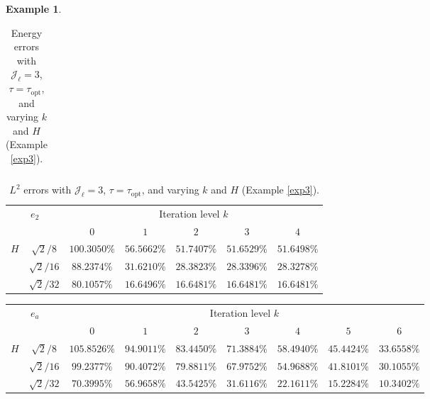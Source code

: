\documentclass{article}[11pt]
\theoremstyle{definition}
\newtheorem{exmp}{Example}[section]
\begin{document}
\begin{exmp}
\begin{table}[ht]
\begin{tabular}{cc||ccccc}
\hline
\end{tabular}
\caption{Energy errors with $\mathcal{J}_{\ell} = 3$, $\tau = \tau_{\text{opt}}$, and varying $k$ and $H$ (Example \ref{exp3}).}
\label{tab:exp3-v-2}
\end{table}

\begin{table}[ht]
\centering
\begin{tabular}{cc||ccccc}
\hline
\multicolumn{2}{c||}{\multirow{2}{*}{$e_2$}}   & \multicolumn{5}{c}{Iteration level $k$}           \\ \cline{3-7} 
\multicolumn{2}{c||}{} &   $0$ & $1$   & $2$   & $3$   & $4$   \\ 
\hline \hline
\multicolumn{1}{c|}{\multirow{3}{*}{$H$}} & 
$\sqrt{2}/8$ & $100.3050\%$ & $56.5662\%$ & $51.7407\%$ & $51.6529\%$ & $51.6498\%$ \\

\multicolumn{1}{c|}{} &  
 $\sqrt{2}/16$ & $88.2374\%$ & $31.6210\%$ & $28.3823\%$ & $28.3396\%$ & $28.3278\%$ \\

\multicolumn{1}{c|}{} &  
 $\sqrt{2}/32$ & $80.1057\%$ & $16.6496\%$ & $16.6481\%$ & $16.6481\%$ & $16.6481\%$ \\

\hline
\end{tabular}
\caption{$L^2$ errors with $\mathcal{J}_{\ell} = 3$, $\tau = \tau_{\text{opt}}$, and varying $k$ and $H$ (Example \ref{exp3}).}
\label{tab:exp3-p-2}
\end{table}


\begin{table}[ht]
\centering
\begin{tabular}{cc||ccccccc}
\hline
\multicolumn{2}{c||}{\multirow{2}{*}{$e_a$}}   & \multicolumn{7}{c}{Iteration level $k$}           \\ \cline{3-9} 
\multicolumn{2}{c||}{} &   $0$ & $1$   & $2$   & $3$   & $4$   &$5$ & $6$ \\ 
\hline \hline
\multicolumn{1}{c|}{\multirow{3}{*}{$H$}} & 
$\sqrt{2}/8$ & $105.8526\%$ & $94.9011\%$ & $83.4450\%$ & $71.3884\%$ & $58.4940\%$ & $45.4424\%$ & $33.6558\%$ \\
\multicolumn{1}{c|}{} &  
$\sqrt{2}/16$ & $99.2377\%$ & $90.4072\%$ & $79.8811\%$ & $67.9752\%$ & $54.9688\%$ & $41.8101\%$ & $30.1055\%$ \\
 
\multicolumn{1}{c|}{} &  
$\sqrt{2}/32$ & $70.3995\%$ & $56.9658\%$ & $43.5425\%$ & $31.6116\%$ & $22.1611\%$ & $15.2284\%$ & $10.3402\%$ \\


\end{tabular}
\end{table}
\end{exmp}
\end{document}
